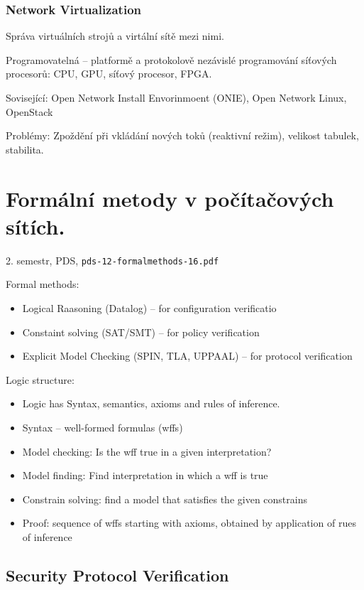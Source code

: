 \documentclass[a4paper, 11pt]{report}
\begin{document}
\subsection{Network Virtualization}
Správa virtuálních strojů a virtální sítě mezi nimi.

Programovatelná  -- platformě a protokolově nezávislé programování síťových procesorů: CPU, GPU, síťový procesor, FPGA.

Sovisející: Open Network Install Envorinmoent (ONIE), Open Network Linux, OpenStack

Problémy: Zpoždění při vkládání nových toků (reaktivní režim), velikost tabulek, stabilita.

\chapter{Formální metody v počítačových sítích.} \label{cha:43}
2. semestr, PDS, \texttt{pds-12-formalmethods-16.pdf}

Formal methods:
\begin{itemize}
	\item Logical Raasoning (Datalog) -- for configuration verificatio
	\item Constaint solving (SAT/SMT) -- for policy verification
	\item Explicit Model Checking (SPIN, TLA, UPPAAL) -- for protocol verification
\end{itemize}

Logic structure:
\begin{itemize}
	\item Logic has Syntax, semantics, axioms and rules of inference.
	\item Syntax -- well-formed formulas (wffs)
	\item Model checking: Is the wff true in a given interpretation?
	\item Model finding: Find interpretation in which a wff is true
	\item Constrain solving: find a model that satisfies the given constrains
	\item Proof: sequence of wffs starting with axioms, obtained by application of rues of inference
\end{itemize}

\section{Security Protocol Verification}
\end{document}
